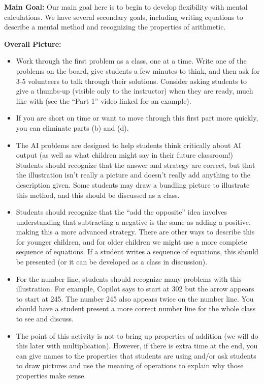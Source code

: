 \documentclass[nooutcomes,noauthor,handout]{ximera}
\begin{document}
\newpage
\begin{instructorNotes}

{\bf Main Goal:} Our main goal here is to begin to develop flexibility with mental calculations. We have several secondary goals, including writing equations to describe a mental method and recognizing the properties of arithmetic.


{\bf Overall Picture:}

\begin{itemize}
\item Work through the first problem as a class, one at a time. Write one of the problems on the board, give students a few minutes to think, and then ask for 3-5 volunteers to talk through their solutions. Consider asking students to give a thumbs-up (visible only to the instructor) when they are ready, much like with  (see the ``Part 1'' video linked for an example).
\item If you are short on time or want to move through this first part more quickly, you can eliminate parts (b) and (d).
\item The AI problems are designed to help students think critically about AI output (as well as what children might say in their future classroom!) Students should recognize that the answer and strategy are correct, but that the illustration isn't really a picture and doesn't really add anything to the description given. Some students may draw a bundling picture to illustrate this method, and this should be discussed as a class.
\item Students should recognize that the ``add the opposite'' idea involves understanding that subtracting a negative is the same as adding a positive, making this a more advanced strategy. There are other ways to describe this for younger children, and for older children we might use a more complete sequence of equations. If a student writes a sequence of equations, this should be presented (or it can be developed as a class in discussion).
\item For the number line, students should recognize many problems with this illustration. For example, Copilot says to start at 302 but the arrow appears to start at 245. The number 245 also appears twice on the number line. You should have a student present a more correct number line for the whole class to see and discuss.

\item The point of this activity is not to bring up properties of addition (we will do this later with multiplication). However, if there is extra time at the end, you can give names to the properties that students are using and/or ask students to draw pictures and use the meaning of operations to explain why those properties make sense.


\end{itemize}
\end{instructorNotes}
\end{document}
